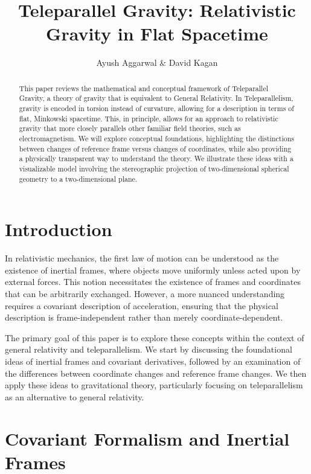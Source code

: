 \documentclass[12pt]{article}
\title{Teleparallel Gravity: Relativistic Gravity in Flat Spacetime}
\author{Ayush Aggarwal & David Kagan}
\date{}
\begin{document}
\maketitle

\begin{abstract}
This paper reviews the mathematical and conceptual framework of Teleparallel Gravity, a theory of gravity that is equivalent to General Relativity. In Teleparallelism, gravity is encoded in torsion instead of curvature, allowing for a description in terms of flat, Minkowski spacetime. This, in principle, allows for an approach to relativistic gravity that more closely parallels other familiar field theories, such as electromagnetism. We will explore conceptual foundations, highlighting the distinctions between changes of reference frame versus changes of coordinates, while also providing a physically transparent way to understand the theory. We illustrate these ideas with a visualizable model involving the stereographic projection of two-dimensional spherical geometry to a two-dimensional plane.
\end{abstract}

\tableofcontents
\newpage

\section{Introduction}
In relativistic mechanics, the first law of motion can be understood as the existence of inertial frames, where objects move uniformly unless acted upon by external forces. This notion necessitates the existence of frames and coordinates that can be arbitrarily exchanged. However, a more nuanced understanding requires a covariant description of acceleration, ensuring that the physical description is frame-independent rather than merely coordinate-dependent.

The primary goal of this paper is to explore these concepts within the context of general relativity and teleparallelism. We start by discussing the foundational ideas of inertial frames and covariant derivatives, followed by an examination of the differences between coordinate changes and reference frame changes. We then apply these ideas to gravitational theory, particularly focusing on teleparallelism as an alternative to general relativity.

\section{Covariant Formalism and Inertial Frames}
\end{document}
